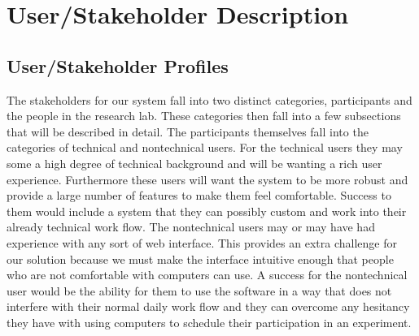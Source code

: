 \section{User/Stakeholder Description}
\subsection{User/Stakeholder Profiles}
The stakeholders for our system fall into two distinct categories, participants and the people in the research lab. These categories then fall into a few subsections that will be described in detail. The participants themselves fall into the categories of technical and nontechnical users. For the technical users they may some a high degree of technical background and will be wanting a rich user experience. Furthermore these users will want the system to be more robust and provide a large number of features to make them feel comfortable. Success to them would include a system that they can possibly custom and work into their already technical work flow. The nontechnical users may or may have had experience with any sort of web interface. This provides an extra challenge for our solution because we must make the interface intuitive enough that people who are not comfortable with computers can use. A success for the nontechnical user would be the ability for them to use the software in a way that does not interfere with their normal daily work flow and they can overcome any hesitancy they have with using computers to schedule their participation in an experiment.
